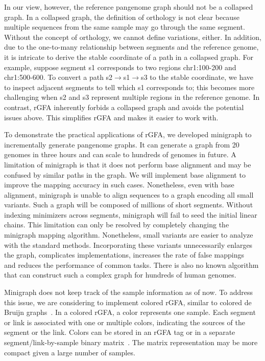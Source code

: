 \documentclass[twocolumn]{bmcart}%
\begin{document}
In our view, however, the reference pangenome graph should not be a collapsed
graph. In a collapsed graph, the definition of orthology is not clear because
multiple sequences from the same sample may go through the same segment.
Without the concept of orthology, we cannot define variations, either.  In
addition, due to the one-to-many relationship between segments and the
reference genome, it is intricate to derive the stable coordinate of a path in
a collapsed graph. For example, suppose segment {\sf s1} corresponds to two
regions {\sf chr1:100-200} and {\sf chr1:500-600}. To convert a path {\sf
s2$\to$s1$\to$s3} to the stable coordinate, we have to inspect adjacent
segments to tell which {\sf s1} corresponds to; this becomes more challenging
when {\sf s2} and {\sf s3} represent multiple regions in the reference genome.
In contrast, rGFA inherently forbids a collapsed graph and avoids the potential
issues above. This simplifies rGFA and makes it easier to work with.

To demonstrate the practical applications of rGFA, we developed minigraph to
incrementally generate pangenome graphs. It can generate a graph from 20
genomes in three hours and can scale to hundreds of genomes in future. A
limitation of minigraph is that it does not perform base alignment and may be
confused by similar paths in the graph. We will implement base alignment to
improve the mapping accuracy in such cases. Nonetheless, even with base
alignment, minigraph is unable to align sequences to a graph encoding all small
variants. Such a graph will be composed of millions of short segments. Without
indexing minimizers across segments, minigraph will fail to seed the initial
linear chains. This limitation can only be resolved by completely changing the
minigraph mapping algorithm. Nonetheless, small variants are easier to
analyze with the standard methods. Incorporating these variants unnecessarily
enlarges the graph, complicates implementations, increases the rate of false
mappings~\cite{Pritt_2018} and reduces the performance of common tasks. There
is also no known algorithm that can construct such a complex graph for hundreds
of human genomes.

Minigraph does not keep track of the sample information as of now. To address
this issue, we are considering to implement colored rGFA, similar to colored de
Bruijn graphs~\cite{Iqbal:2012aa}. In a colored rGFA, a color represents one
sample.  Each segment or link is associated with one or multiple colors,
indicating the sources of the segment or the link. Colors can be stored in an
rGFA tag or in a separate segment/link-by-sample binary
matrix~\cite{Holley695338}. The matrix representation may be more compact given
a large number of samples.
\end{document}
